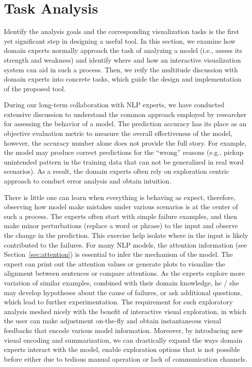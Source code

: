 \section{Task Analysis}
\label{sec:task}
Identify the analysis goals and the corresponding visualization tasks is the first yet significant step in designing a useful tool. In this section, we examine how domain experts normally approach the task of analyzing a model (i.e., assess its strength and weakness) and identify where and how an interactive visualization system can aid in such a process.
Then, we reify the multitude discussion with domain experts into concrete tasks, which guide the design and implementation of the proposed tool.

During our long-term collaboration with NLP experts, we have conducted extensive discussion to understand the common approach employed by researcher for assessing the behavior of a model.%
The prediction accuracy has its place as an objective evaluation metric to measure the overall effectiveness of the model, however, the accuracy number alone does not provide the full story.
For example, the model may produce correct predictions for the ``wrong'' reasons (e.g., pickup unintended pattern in the training data that can not be generalized in real word scenarios).
%
As a result, the domain experts often rely on exploration centric approach to conduct error analysis and obtain intuition.

There is little one can learn when everything is behaving as expect, therefore,
observing how model make mistakes under various scenarios is at the center of such a process.
The experts often start with simple failure examples, and then make minor perturbations (replace a word or phrase) to the input and observe the change in the prediction. This exercise help isolate where in the input is likely contributed to the failures. For many NLP models, the attention information (see Section~\ref{sec:attention}) is essential to infer the mechanism of the model. The expert can print out the attention values or generate plots to visualize the alignment between sentences or compare attentions. As the experts explore more variation of similar examples, combined with their domain knowledge, he / she may develop hypotheses about the cause of failures, or ask additional questions, which lead to further experimentation.
%
The requirement for such exploratory analysis meshed nicely with the benefit of interactive visual exploration, in which the user can make adjustment on-the-fly and obtain instantaneous visual feedbacks that encode various model information.
%
Moreover, by introducing new visual encoding and summarization, we can drastically expand the ways domain experts interact with the model, enable exploration options that is not possible before either due to tedious manual operation or lack of communication channels.

